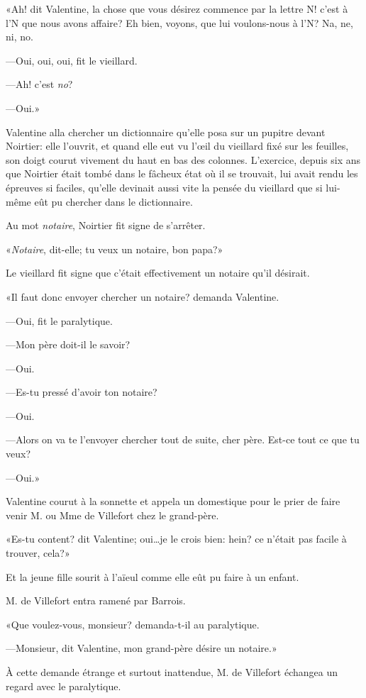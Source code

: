 «Ah! dit Valentine, la chose que vous désirez commence par la lettre N! c'est à l'N que nous avons affaire? Eh bien, voyons, que lui voulons-nous à l'N? Na, ne, ni, no. 

—Oui, oui, oui, fit le vieillard. 

—Ah! c'est \textit{no}? 

—Oui.» 

Valentine alla chercher un dictionnaire qu'elle posa sur un pupitre devant Noirtier: elle l'ouvrit, et quand elle eut vu l'œil du vieillard fixé sur les feuilles, son doigt courut vivement du haut en bas des colonnes. L'exercice, depuis six ans que Noirtier était tombé dans le fâcheux état où il se trouvait, lui avait rendu les épreuves si faciles, qu'elle devinait aussi vite la pensée du vieillard que si lui-même eût pu chercher dans le dictionnaire. 

Au mot \textit{notaire}, Noirtier fit signe de s'arrêter. 

«\textit{Notaire}, dit-elle; tu veux un notaire, bon papa?» 

Le vieillard fit signe que c'était effectivement un notaire qu'il désirait. 

«Il faut donc envoyer chercher un notaire? demanda Valentine. 

—Oui, fit le paralytique. 

—Mon père doit-il le savoir? 

—Oui. 

—Es-tu pressé d'avoir ton notaire? 

—Oui. 

—Alors on va te l'envoyer chercher tout de suite, cher père. Est-ce tout ce que tu veux? 

—Oui.» 

Valentine courut à la sonnette et appela un domestique pour le prier de faire venir M. ou Mme de Villefort chez le grand-père. 

«Es-tu content? dit Valentine; oui\dots je le crois bien: hein? ce n'était pas facile à trouver, cela?» 

Et la jeune fille sourit à l'aïeul comme elle eût pu faire à un enfant. 

M. de Villefort entra ramené par Barrois. 

«Que voulez-vous, monsieur? demanda-t-il au paralytique. 

—Monsieur, dit Valentine, mon grand-père désire un notaire.» 

À cette demande étrange et surtout inattendue, M. de Villefort échangea un regard avec le paralytique. 

